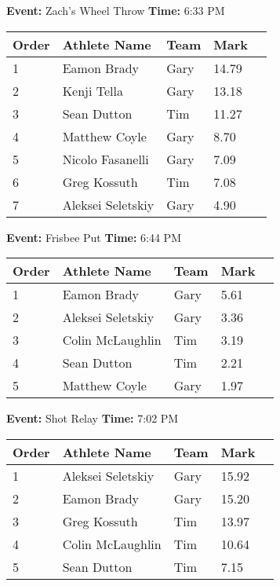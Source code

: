 \documentclass[10pt]{article}
\begin{document}
\textbf{Event:} Zach's Wheel Throw \quad \textbf{Time:} 6:33 PM 

\vspace{1em}
\begin{tabular}{@{}lllll@{}}
\toprule

\textbf{Order} & \textbf{Athlete Name} & \textbf{Team} & \textbf{Mark} \\
\midrule
1 & Eamon Brady & Gary & 14.79 &\\
2 & Kenji Tella & Gary & 13.18 &\\
3 & Sean Dutton & Tim & 11.27 &\\
4 & Matthew Coyle & Gary & 8.70 &\\
5 & Nicolo Fasanelli & Gary & 7.09 &\\
6 & Greg Kossuth & Tim & 7.08 &\\
7 & Aleksei Seletskiy & Gary & 4.90 &\\
\bottomrule
\end{tabular}
\vspace{2.5em}


\textbf{Event:} Frisbee Put \quad \textbf{Time:} 6:44 PM 

\vspace{1em}
\begin{tabular}{@{}lllll@{}}
\toprule

\textbf{Order} & \textbf{Athlete Name} & \textbf{Team} & \textbf{Mark} \\
\midrule
1 & Eamon Brady & Gary & 5.61 &\\
2 & Aleksei Seletskiy & Gary & 3.36 &\\
3 & Colin McLaughlin & Tim & 3.19 &\\
4 & Sean Dutton & Tim & 2.21 &\\
5 & Matthew Coyle & Gary & 1.97 &\\
\bottomrule
\end{tabular}
\vspace{2.5em}


\textbf{Event:} Shot Relay \quad \textbf{Time:} 7:02 PM 

\vspace{1em}
\begin{tabular}{@{}lllll@{}}
\toprule

\textbf{Order} & \textbf{Athlete Name} & \textbf{Team} & \textbf{Mark} \\
\midrule
1 & Aleksei Seletskiy & Gary & 15.92 &\\
2 & Eamon Brady & Gary & 15.20 &\\
3 & Greg Kossuth & Tim & 13.97 &\\
4 & Colin McLaughlin & Tim & 10.64 &\\
5 & Sean Dutton & Tim & 7.15 &\\
\bottomrule
\end{tabular}
\vspace{2.5em}
\end{document}

